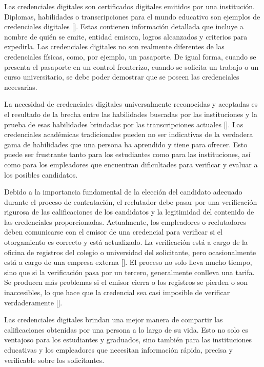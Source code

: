 Las credenciales digitales son certificados digitales emitidos por una instituci\'on. Diplomas, habilidades o transcripciones para el mundo educativo son ejemplos de credenciales digitales [\cite{68}]. Estas contienen informaci\'on detallada que incluye a nombre de qui\'en se emite, entidad emisora, logros alcanzados y criterios para expedirla. Las credenciales digitales no son realmente diferentes de las credenciales f\'isicas, como, por ejemplo, un pasaporte. De igual forma, cuando se presenta el pasaporte en un control fronterizo, cuando se solicita un trabajo o un curso universitario, se debe poder demostrar que se poseen las credenciales necesarias.

La necesidad de credenciales digitales universalmente reconocidas y aceptadas es el resultado de la brecha entre las habilidades buscadas por las instituciones y la prueba de esas habilidades brindadas por las transcripciones actuales [\cite{4,68,69}]. Las credenciales acad\'emicas tradicionales pueden no ser indicativas de la verdadera gama de habilidades que una persona ha aprendido y tiene para ofrecer. Esto puede ser frustrante tanto para los estudiantes como para las instituciones, as\'i como para los empleadores que encuentran dificultades para verificar y evaluar a los posibles candidatos.

Debido a la importancia fundamental de la elecci\'on del candidato adecuado durante el proceso de contrataci\'on, el reclutador debe pasar por una verificaci\'on rigurosa de las calificaciones de los candidatos y la legitimidad del contenido de las credenciales proporcionadas. Actualmente, los empleadores o reclutadores deben comunicarse con el emisor de una credencial para verificar si el otorgamiento es correcto y est\'a actualizado. La verificaci\'on est\'a a cargo de la oficina de registros del colegio o universidad del solicitante, pero ocasionalmente est\'a a cargo de una empresa externa [\cite{63,71}]. El proceso no solo lleva mucho tiempo, sino que si la verificaci\'on pasa por un tercero, generalmente conlleva una tarifa. Se producen m\'as problemas si el emisor cierra o los registros se pierden o son inaccesibles, lo que hace que la credencial sea casi imposible de verificar verdaderamente [\cite{4}].

Las credenciales digitales brindan una mejor manera de compartir las calificaciones obtenidas por una persona a lo largo de su vida. Esto no solo es ventajoso para los estudiantes y graduados, sino tambi\'en para las instituciones educativas y los empleadores que necesitan informaci\'on r\'apida, precisa y verificable sobre los solicitantes.

